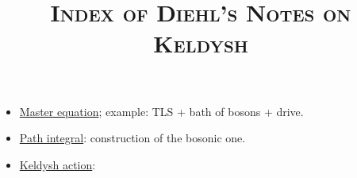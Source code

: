\documentclass[a4paper,12pt]{article}
\title{\textsc{Index of Diehl's Notes on Keldysh}}
\newcommand{\uitem}[1]{\item \underline{#1}}
\begin{document}
\maketitle

\begin{itemize}

	\uitem{Master equation}; example: TLS + bath of bosons + drive.

	\uitem{Path integral}: construction of the bosonic one.

	\uitem{Keldysh action}:

\end{itemize}
\end{document}
